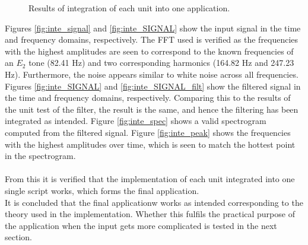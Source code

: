 \begin{figure}[H]
\begin{subfigure}{0.49\textwidth}
\end{subfigure}
\caption{Results of integration of each unit into one application.}
\label{fig:inte_validation}
\end{figure}
Figures \ref{fig:inte_signal} and \ref{fig:inte_SIGNAL} show the input signal in the time and frequency domains, respectively. The FFT used is verified as the frequencies with the highest amplitudes are seen to correspond to the known frequencies of an $E_2$ tone (82.41 Hz) and two corresponding harmonics (164.82 Hz and 247.23 Hz). Furthermore, the noise appears similar to white noise across all frequencies.\\
Figures \ref{fig:inte_SIGNAL} and \ref{fig:inte_SIGNAL_filt} show the filtered signal in the time and frequency domains, respectively. Comparing this to the results of the unit test of the filter, the result is the same, and hence the filtering has been integrated as intended. Figure \ref{fig:inte_spec} shows a valid spectrogram computed from the filtered signal. Figure \ref{fig:inte_peak} shows the frequencies with the highest amplitudes over time, which is seen to match the hottest point in the spectrogram. \\
\\
From this it is verified that the implementation of each unit integrated into one single script works, which forms the final application. \\
It is concluded that the final applicationw works as intended corresponding to the theory used in the implementation. Whether this fulfils the practical purpose of the application when the input gets more complicated is tested in the next section.